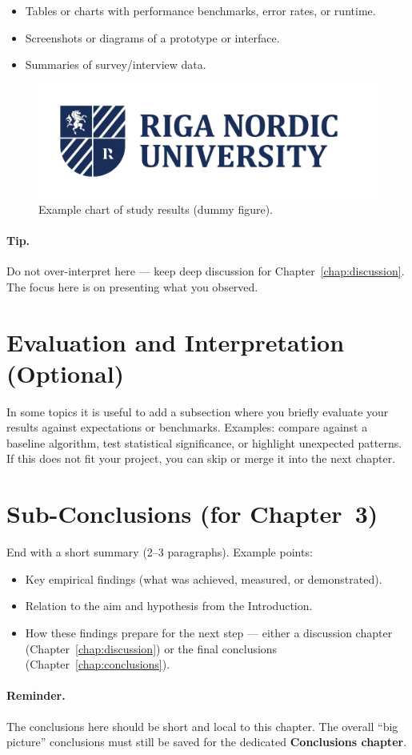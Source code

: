 \begin{itemize}[leftmargin=1.2cm]
  \item Tables or charts with performance benchmarks, error rates, or runtime.  
  \item Screenshots or diagrams of a prototype or interface.  
  \item Summaries of survey/interview data.  
\end{itemize}

\begin{figure}[h]
  \centering
  \includegraphics[width=0.6\linewidth]{b_chapters/chapter1/assets/RNU_large_logo.png}
  \caption{Example chart of study results (dummy figure).}
  \label{fig:study-results}
\end{figure}

\paragraph{Tip.} Do not over-interpret here — keep deep discussion for Chapter~\ref{chap:discussion}.  
The focus here is on presenting what you observed.

\section{Evaluation and Interpretation (Optional)}
\label{sec:evaluation}
In some topics it is useful to add a subsection where you briefly evaluate your results against expectations or benchmarks.  
Examples: compare against a baseline algorithm, test statistical significance, or highlight unexpected patterns.  
If this does not fit your project, you can skip or merge it into the next chapter.

\section{Sub-Conclusions (for Chapter~3)}
\label{sec:subconcl3}
End with a short summary (2–3 paragraphs).  
Example points:

\begin{itemize}[leftmargin=1.2cm]
  \item Key empirical findings (what was achieved, measured, or demonstrated).  
  \item Relation to the aim and hypothesis from the Introduction.  
  \item How these findings prepare for the next step — either a discussion chapter (Chapter~\ref{chap:discussion}) or the final conclusions (Chapter~\ref{chap:conclusions}).  
\end{itemize}

\paragraph{Reminder.} The conclusions here should be short and local to this chapter. The overall “big picture” conclusions must still be saved for the dedicated \textbf{Conclusions chapter}.
